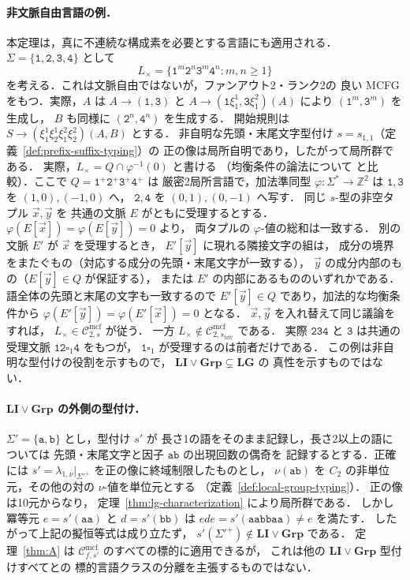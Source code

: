 \documentclass[11pt,a4paper]{ltjsarticle}
\numberwithin{equation}{section}
\theoremstyle{plain}
\theoremstyle{definition}
\theoremstyle{remark}
\newcommand{\Cmcf}[2]{\mathcal{C}^{\mathrm{mcf}}_{#1,#2}}
\newcommand{\tuple}[1]{\vec{#1}}
\newcommand{\blank}{\square}
\theoremstyle{plain}
\begin{document}
\paragraph{非文脈自由言語の例．}
本定理は，真に不連続な構成素を必要とする言語にも適用される．
$\Sigma=\{\mathtt1,\mathtt2,\mathtt3,\mathtt4\}$ として
\[
L_\times=\{\mathtt1^m\mathtt2^n\mathtt3^m\mathtt4^n:m,n\ge1\}
\]
を考える．これは文脈自由ではないが，ファンアウト2・ランク2の
良い MCFG をもつ．実際，$A$ は
$A\to(\mathtt1,\mathtt3)$ と
$A\to(\mathtt1\xi_1^1,\mathtt3\xi_1^2)(A)$ により
$(\mathtt1^m,\mathtt3^m)$ を生成し，
$B$ も同様に $(\mathtt2^n,\mathtt4^n)$ を生成する．
開始規則は
$S\to(\xi_1^1\xi_2^1\xi_1^2\xi_2^2)(A,B)$ とする．
非自明な先頭・末尾文字型付け
$s=s_{1,1}$（定義~\ref{def:prefix-suffix-typing}）の
正の像は局所自明であり，したがって局所群である．
実際，$L_\times=Q\cap\varphi^{-1}(0)$ と書ける
（均衡条件の論法について
\cite[Proposition~3.1]{KuriyamaMCFGpreprint} と比較）．ここで
$Q=\mathtt1^+\mathtt2^+\mathtt3^+\mathtt4^+$ は
厳密2局所言語で，加法準同型
$\varphi:\Sigma^*\to\mathbb Z^2$ は
$\mathtt1,\mathtt3$ を $(1,0),(-1,0)$ へ，
$\mathtt2,\mathtt4$ を $(0,1),(0,-1)$ へ写す．
同じ $s$-型の非空タプル $\tuple x,\tuple y$ を
共通の文脈 $E$ がともに受理するとする．
$\varphi(E[\tuple x])=\varphi(E[\tuple y])=0$ より，
両タプルの $\varphi$-値の総和は一致する．
別の文脈 $E'$ が $\tuple x$ を受理するとき，
$E'[\tuple y]$ に現れる隣接文字の組は，
成分の境界をまたぐもの（対応する成分の先頭・末尾文字が一致する），
$\tuple y$ の成分内部のもの（$E[\tuple y]\in Q$ が保証する），
または $E'$ の内部にあるもののいずれかである．
語全体の先頭と末尾の文字も一致するので
$E'[\tuple y]\in Q$ であり，加法的な均衡条件から
$\varphi(E'[\tuple y])=\varphi(E'[\tuple x])=0$ となる．
$\tuple x,\tuple y$ を入れ替えて同じ議論をすれば，
$L_\times\in\Cmcf{2}{s}$ が従う．
一方 $L_\times\notin\Cmcf{2}{s_{\mathrm{triv}}}$ である．
実際 $\mathtt{234}$ と $\mathtt3$ は共通の受理文脈
$\mathtt{12}\blank_1\mathtt4$ をもつが，
$\mathtt1\blank_1$ が受理するのは前者だけである．
この例は非自明な型付けの役割を示すもので，
$\mathbf{LI}\vee\mathbf{Grp}\subsetneq\mathbf{LG}$ の
真性を示すものではない．

\paragraph{$\mathbf{LI}\vee\mathbf{Grp}$ の外側の型付け．}
$\Sigma'=\{\mathtt a,\mathtt b\}$ とし，型付け $s'$ が
長さ1の語をそのまま記録し，長さ2以上の語については
先頭・末尾文字と因子 $\mathtt{ab}$ の出現回数の偶奇を
記録するとする．正確には
$s'=\lambda_{1,\nu}|_{\Sigma'^+}$ を正の像に終域制限したものとし，
$\nu(\mathtt{ab})$ を $C_2$ の非単位元，その他の対の
$\nu$-値を単位元とする
（定義~\ref{def:local-group-typing}）．
正の像は10元からなり，
定理~\ref{thm:lg-characterization} により局所群である．
しかし冪等元 $e=s'(\mathtt{aa})$ と
$d=s'(\mathtt{bb})$ は
$ede=s'(\mathtt{aabbaa})\ne e$ を満たす．
したがって上記の擬恒等式は成り立たず，
$s'(\Sigma'^+)\notin\mathbf{LI}\vee\mathbf{Grp}$ である．
定理~\ref{thm:A} は $\Cmcf{f}{s'}$ のすべての標的に適用できるが，
これは他の $\mathbf{LI}\vee\mathbf{Grp}$ 型付けすべてとの
標的言語クラスの分離を主張するものではない．
\end{document}
